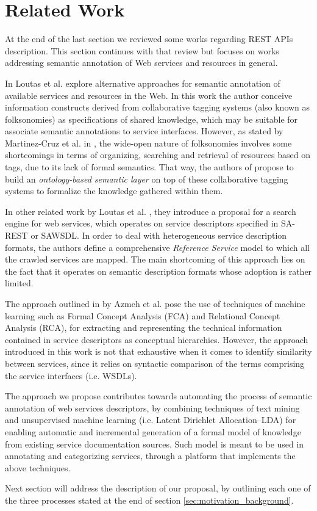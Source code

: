 \section{Related Work}
\label{sec:related_work}

\noindent At the end of the last section we reviewed some works regarding REST APIs description. This section continues with that review but focuses on works addressing semantic annotation of Web services and resources in general.

In \cite{Loutas:2010} Loutas et al. explore alternative approaches for semantic annotation of available services and resources in the Web. In this work the author conceive information constructs derived from collaborative tagging systems (also known as folksonomies) as specifications of shared knowledge, which may be suitable for associate semantic annotations to service interfaces. However, as stated by Martinez-Cruz et al. in \cite{MartinezCruz:2010}, the wide-open nature of folksonomies involves some shortcomings in terms of organizing, searching and retrieval of resources based on tags, due to its lack of formal semantics. That way, the authors of \cite{MartinezCruz:2010} propose to build an \textit{ontology-based semantic layer} on top of these collaborative tagging systems to formalize the knowledge gathered within them. 

In other related work by Loutas et al. \cite{Loutas:2012}, they introduce a proposal for a search engine for web services, which operates on service descriptors specified in SA-REST or SAWSDL. In order to deal with heterogeneous service description formats, the authors define a comprehensive \textit{Reference Service} model to which all the crawled services are mapped. The main shortcoming of this approach lies on the fact that it operates on semantic description formats whose adoption is rather limited.

The approach outlined in \cite{Azmeh:2010} by Azmeh et al. pose the use of techniques of machine learning such as Formal Concept Analysis (FCA) and Relational Concept Analysis (RCA), for extracting and representing the technical information contained in service descriptors as conceptual hierarchies. However, the approach introduced in this work is not that exhaustive when it comes to identify similarity between services, since it relies on syntactic comparison of the terms comprising the service interfaces (i.e. WSDLs). 

The approach we propose contributes towards automating the process of semantic annotation of web services descriptors, by combining techniques of text mining and unsupervised machine learning (i.e. Latent Dirichlet Allocation–LDA) for enabling  automatic and incremental generation of a formal model of knowledge from existing service documentation sources. Such model is meant to be used in annotating and categorizing services, through a platform that implements the above techniques. 

Next section will address the description of our proposal, by outlining each one of the three processes stated at the end of section \ref{sec:motivation_background}.
